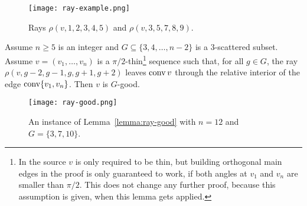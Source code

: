\begin{figure}[ht]
  \centering
  \texttt{[image: ray-example.png]}
  \caption{Rays $\rho(v,1,2,3,4,5)$ and $\rho(v,3,5,7,8,9)$. \cite[Figure 5]{shitov2020sublinear}}
  \label{fig:ray-example}
\end{figure}

\begin{lemma}\label{lemma:ray-good}
  Assume $n\geq 5$ is an integer and $G\subseteq\{3,4,\dots,n-2\}$ is a $3$-scattered subset. Assume $v=(v_1,\dots,v_n)$ is a $\pi/2$-thin\footnote{In the source $v$ is only required to be thin, but building orthogonal main edges in the proof is only guaranteed to work, if both angles at $v_1$ and $v_n$ are smaller than $\pi/2$. This does not change any further proof, because this assumption is given, when this lemma gets applied.} sequence such that, for all $g\in G$, the ray $\rho(v, g-2,g-1,g,g+1,g+2)$ leaves $\operatorname{conv} v$ through the relative interior of the edge $\operatorname{conv}\{v_1, v_n\}$. Then $v$ is $G$-good.
\end{lemma}

\begin{figure}[ht]
  \centering
  \texttt{[image: ray-good.png]}
  \caption{An instance of Lemma~\ref{lemma:ray-good} with $n=12$ and $G=\{3,7,10\}$. \cite[Figure 7]{shitov2020sublinear}}
  \label{fig:ray-good}
\end{figure}

